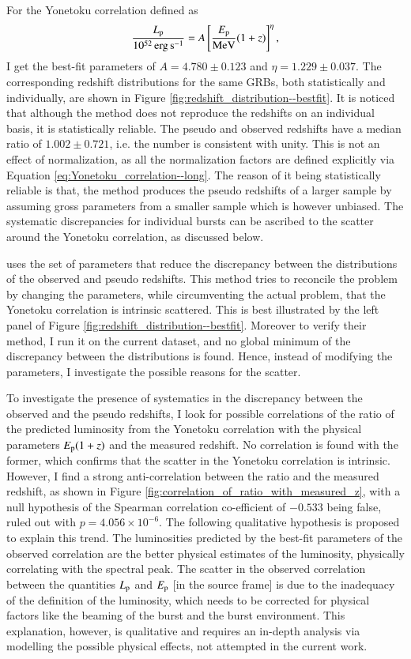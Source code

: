 For the Yonetoku correlation defined as 
\begin{equation}
\dfrac{ L_{\rm p} }{10^{52} \, \rm erg \, s^{-1}} = A \left[ \dfrac{E_{\rm p}}{ {\rm MeV} } (1+z) \right]^{\eta},
\label{eq:Yonetoku_correlation--long}
\end{equation} I get the best-fit parameters of $A = 4.780 \pm 0.123$ and $\eta = 1.229 \pm 0.037$. The corresponding redshift distributions for the same GRBs, both statistically and individually, are shown in Figure \ref{fig:redshift_distribution--bestfit}. It is noticed that although the method does not reproduce the redshifts on an individual basis, it is statistically reliable. The pseudo and observed redshifts have a median ratio of $1.002 \pm 0.721$, i.e. the number is consistent with unity. This is not an effect of normalization, as all the normalization factors are defined explicitly via Equation \ref{eq:Yonetoku_correlation--long}. The reason of it being statistically reliable is that, the method produces the pseudo redshifts of a larger sample by assuming gross parameters from a smaller sample which is however unbiased. The systematic discrepancies for individual bursts can be ascribed to the scatter around the Yonetoku correlation, as discussed below.

 uses the set of parameters that reduce the discrepancy between the distributions of the observed and pseudo redshifts. This method tries to reconcile the problem by changing the parameters, while circumventing the actual problem, that the Yonetoku correlation is intrinsic scattered. This is best illustrated by the left panel of Figure \ref{fig:redshift_distribution--bestfit}. Moreover to verify their method, I run it on the current dataset, and no global minimum of the discrepancy between the distributions is found. Hence, instead of modifying the parameters, I investigate the possible reasons for the scatter.

To investigate the presence of systematics in the discrepancy between the observed and the pseudo redshifts, I look for possible correlations of the ratio of the predicted luminosity from the Yonetoku correlation with the physical parameters $E_{\rm p} (1+z)$ and the measured redshift. No correlation is found with the former, which confirms that the scatter in the Yonetoku correlation is intrinsic. However, I find a strong anti-correlation between the ratio and the measured redshift, as shown in Figure \ref{fig:correlation_of_ratio_with_measured_z}, with a null hypothesis of the Spearman correlation co-efficient of $-0.533$ being false, ruled out with $p = 4.056 \times 10^{-6}$. The following qualitative hypothesis is proposed to explain this trend. The luminosities predicted by the best-fit parameters of the observed correlation are the better physical estimates of the luminosity, physically correlating with the spectral peak. The scatter in the observed correlation between the quantities $L_{\rm p}$ and $E_{\rm p}$ [in the source frame] is due to the inadequacy of the definition of the luminosity, which needs to be corrected for physical factors like the beaming of the burst and the burst environment. This explanation, however, is qualitative and requires an in-depth analysis via modelling the possible physical effects, not attempted in the current work.


